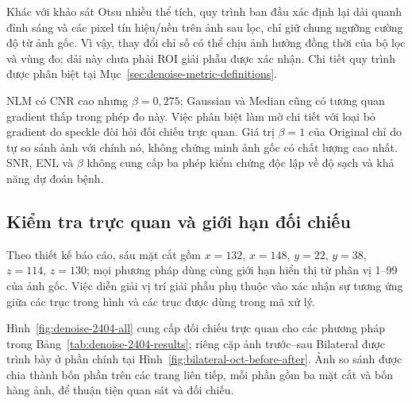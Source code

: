 \documentclass[14pt,a4paper,oneside]{extreport}
\begin{document}
Khác với khảo sát Otsu nhiều thể tích, quy trình ban đầu xác định
lại dải quanh đỉnh sáng và các pixel tín hiệu/nền trên ảnh sau
lọc, chỉ giữ chung ngưỡng cường độ từ ảnh gốc. Vì vậy, thay đổi
chỉ số có thể chịu ảnh hưởng đồng thời của bộ lọc và vùng đo;
dải này chưa phải ROI giải phẫu được xác nhận. Chi tiết quy trình
được phân biệt tại Mục~\ref{sec:denoise-metric-definitions}.

NLM có CNR cao nhưng $\beta=0{,}275$; Gaussian và Median cũng có tương
quan gradient thấp trong phép đo này. Việc phân biệt làm mờ chi tiết với
loại bỏ gradient do speckle đòi hỏi đối chiếu trực quan. Giá trị $\beta=1$ của Original
chỉ do tự so sánh ảnh với chính nó, không chứng minh ảnh gốc có chất lượng
cao nhất. SNR, ENL và $\beta$ không cung cấp ba phép kiểm chứng độc lập
về độ sạch và khả năng dự đoán bệnh.

\subsection{Kiểm tra trực quan và giới hạn đối chiếu}
Theo thiết kế báo cáo, sáu mặt cắt gồm $x=132$, $x=148$, $y=22$, $y=38$,
$z=114$, $z=130$; mọi phương pháp dùng cùng giới hạn hiển thị từ phân vị
1--99 của ảnh gốc. Việc diễn giải vị trí giải phẫu phụ thuộc vào xác nhận
sự tương ứng giữa các trục trong hình và các trục được dùng trong mã xử lý.

Hình~\ref{fig:denoise-2404-all} cung cấp đối chiếu trực quan cho các
phương pháp trong Bảng~\ref{tab:denoise-2404-results}; riêng cặp ảnh
trước--sau Bilateral được trình bày ở phần chính tại
Hình~\ref{fig:bilateral-oct-before-after}. Ảnh so sánh được chia thành
bốn phần trên các trang liên tiếp, mỗi phần gồm ba mặt cắt và bốn
hàng ảnh, để thuận tiện quan sát và đối chiếu.
\end{document}
